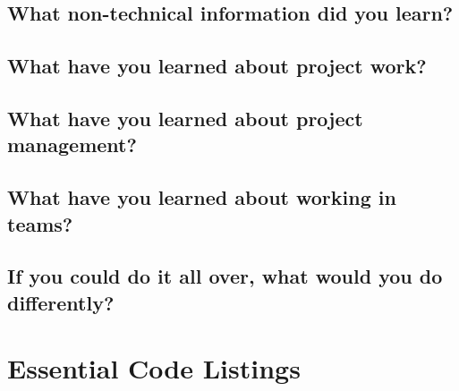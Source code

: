 \documentclass[onecolumn, draftclsnofoot,10pt, compsoc]{report}
\begin{document}
\subsection{What non-technical information did you learn?}
\subsection{What have you learned about project work?}
\subsection{What have you learned about project management?}
\subsection{What have you learned about working in teams?}
\subsection{If you could do it all over, what would you do differently?}

\appendix
\minitoc
\section{Essential Code Listings}
\end{document}
